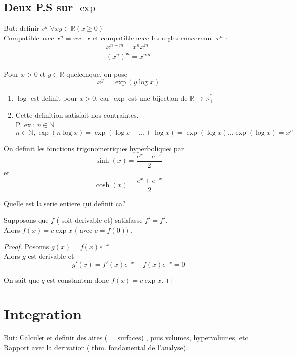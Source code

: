 \documentclass[../main.tex]{subfiles}
\begin{document}
\subsection{Deux P.S sur $\exp$}
But: definir $x^{y}$ $\forall x y \in \mathbb{R} ( x \geq 0) $ \\
Compatible avec $x^{n}= x x \ldots x$ et compatible avec les regles concernant $x^{n}$ :
\begin{align*}
x^{n+m} = x^{n} x^{m}\\
( x^{n} )^{m} = x^{nm}
\end{align*}
\begin{defn}
Pour $x>0$ et $y \in \mathbb{R}$ quelconque, on pose 
\[ 
	x^{y} = \exp ( y \log x ) 
\]

\end{defn}
\begin{rmq}
	\begin{enumerate}
		\item $\log$ est definit pour $x>0$, car $\exp$ est une bijection de $\mathbb{R} \to \mathbb{R}_+ ^{*}$ 
		\item Cette definition satisfait nos contraintes.\\
			P. ex.: $n \in \mathbb{N}$ 
			\[ 
				n \in \mathbb{N}, \exp ( n \log x) = \exp ( \log x + \ldots + \log x) = \exp( \log x)\ldots \exp( \log x) = x^{n} 
			\]
	
	\end{enumerate}
	
\end{rmq}
On definit les fonctions trigonometriques hyperboliques par
\[ 
	\sinh ( x)  = \frac{e^{x}- e^{-x}}{2}
\]
et
\[ 
	\cosh ( x) = \frac{e^{x}+ e^{-x}}{2}
\]

\begin{exo}
Quelle est la serie entiere qui definit ca?
\end{exo}
\begin{propo}
	Supposons que $f$ ( soit derivable et) satisfasse $f'= f'$.\\
	Alors $f( x) = c \exp x$ ( avec $c=f( 0) $) .
\end{propo}
\begin{proof}
	Posonns $g( x) = f( x) e^{-x} $\\
	Alors $g$ est derivable et
	\[ 
		g'( x) = f'( x) e^{-x} - f( x) e^{-x} =0
	\]
	
	On sait que $g$ est constantem donc $f( x) = c \exp x$.
\end{proof}

\section{Integration}
But: Calculer et definir des aires ( = surfaces) , puis volumes, hypervolumes, etc.\\
Rapport avec la derivation ( thm. fondamental de l'analyse).
\end{document}
